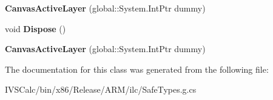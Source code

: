 \begin{DoxyCompactItemize}
{\bfseries Canvas\+Active\+Layer} (global\+::\+System.\+Int\+Ptr dummy)
\item 
\mbox{\label{class_microsoft_1_1_graphics_1_1_canvas_1_1_canvas_active_layer_aa568cf33c9c475ad1acf79d60d2864e1}} 
void {\bfseries Dispose} ()
\item 
\mbox{\label{class_microsoft_1_1_graphics_1_1_canvas_1_1_canvas_active_layer_a66dc0bb04a2b650841d23aed84aaf5af}} 
{\bfseries Canvas\+Active\+Layer} (global\+::\+System.\+Int\+Ptr dummy)
\end{DoxyCompactItemize}


The documentation for this class was generated from the following file\+:\begin{DoxyCompactItemize}
\item 
I\+V\+S\+Calc/bin/x86/\+Release/\+A\+R\+M/ilc/Safe\+Types.\+g.\+cs\end{DoxyCompactItemize}
